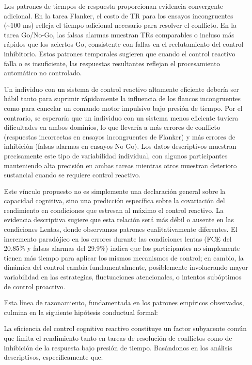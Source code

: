 \documentclass[
  spanish,
  10pt,
]{article}
\begin{document}
Los patrones de tiempos de respuesta proporcionan evidencia convergente
adicional. En la tarea Flanker, el costo de TR para los ensayos
incongruentes (\textasciitilde100 ms) refleja el tiempo adicional
necesario para resolver el conflicto. En la tarea Go/No-Go, las falsas
alarmas muestran TRs comparables o incluso más rápidos que los aciertos
Go, consistente con fallas en el reclutamiento del control inhibitorio.
Estos patrones temporales sugieren que cuando el control reactivo falla
o es insuficiente, las respuestas resultantes reflejan el procesamiento
automático no controlado.

Un individuo con un sistema de control reactivo altamente eficiente
debería ser hábil tanto para suprimir rápidamente la influencia de los
flancos incongruentes como para cancelar un comando motor impulsivo bajo
presión de tiempo. Por el contrario, se esperaría que un individuo con
un sistema menos eficiente tuviera dificultades en ambos dominios, lo
que llevaría a más errores de conflicto (respuestas incorrectas en
ensayos incongruentes de Flanker) y más errores de inhibición (falsas
alarmas en ensayos No-Go). Los datos descriptivos muestran precisamente
este tipo de variabilidad individual, con algunos participantes
manteniendo alta precisión en ambas tareas mientras otros muestran
deterioro sustancial cuando se requiere control reactivo.

Este vínculo propuesto no es simplemente una declaración general sobre
la capacidad cognitiva, sino una predicción específica sobre la
covariación del rendimiento en condiciones que estresan al máximo el
control reactivo. La evidencia descriptiva sugiere que esta relación
será más débil o ausente en las condiciones Lentas, donde observamos
patrones cualitativamente diferentes. El incremento paradójico en los
errores durante las condiciones lentas (FCE del 20.85\% y falsas alarmas
del 29.9\%) indica que los participantes no simplemente tienen más
tiempo para aplicar los mismos mecanismos de control; en cambio, la
dinámica del control cambia fundamentalmente, posiblemente involucrando
mayor variabilidad en las estrategias, fluctuaciones atencionales, o
intentos subóptimos de control proactivo.

Esta línea de razonamiento, fundamentada en los patrones empíricos
observados, culmina en la siguiente hipótesis conductual formal:

La eficiencia del control cognitivo reactivo constituye un factor
subyacente común que limita el rendimiento tanto en tareas de resolución
de conflictos como de inhibición de la respuesta bajo presión de tiempo.
Basándonos en los análisis descriptivos, específicamente que:
\end{document}
